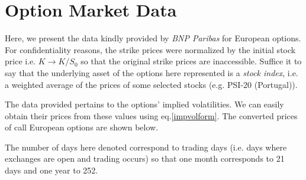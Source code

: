 
\chapter{Option Market Data}
\label{chapter:mktdata}

Here, we present the data kindly provided by \emph{BNP Paribas} for European options. For confidentiality reasons, the strike prices were normalized by the initial stock price i.e. $K\rightarrow K/S_0$ so that the original strike prices are inaccessible.
Suffice it to say that the underlying asset of the options here represented is a \emph{stock index}, i.e. a weighted average of the prices of some selected stocks (e.g. PSI-20 (Portugal)).

The data provided pertains to the options' implied volatilities. We can easily obtain their prices from these values using eq.\eqref{impvolform}. The converted prices of call European options are shown below.

The number of days here denoted correspond to trading days (i.e. days where exchanges are open and trading occurs) so that one month corresponds to 21 days and one year to 252.

